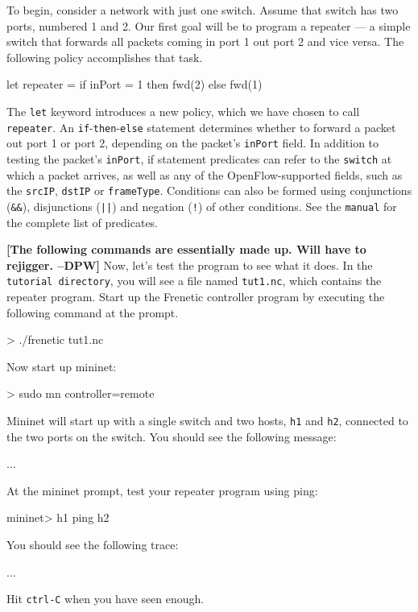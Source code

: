 \documentclass{article}
\newcommand{\finish}[2][cornellred]{\ifdraft\textcolor{#1}{\textbf{[#2]}}\fi}
\newcommand{\dpw}[1]{\finish[cornellred]{#1 --DPW}}
\newcommand{\code}[1]{\texttt{#1}}
\newcommand{\tutorialdir}{\texttt{tutorial directory}}
\newcommand{\manualref}{\texttt{manual}}
\begin{document}
To begin, consider a network with just one switch.  Assume that switch 
has two ports, numbered 1 and 2.  Our first goal will be to program
a repeater --- a simple switch that forwards all packets coming in port 1
out port 2 and vice versa.  The following policy accomplishes that task.

\begin{progeg}
let repeater =
  if inPort = 1 then fwd(2)
  else fwd(1)
\end{progeg}

The \code{let} keyword introduces a new policy, which we have chosen to call 
\code{repeater}.  An \code{if}-\code{then}-\code{else} statement determines
whether to forward a packet out port 1 or port 2, depending on the packet's
\code{inPort} field.  In addition to testing the packet's \code{inPort}, 
if statement predicates can refer to
the \code{switch} 
at which a packet arrives, as well as any of the OpenFlow-supported
fields, such as the \code{srcIP}, \code{dstIP} or \code{frameType}.  
Conditions can also be formed using 
conjunctions (\code{\&\&}), disjunctions
(\code{||}) and negation (\code{!}) of other conditions.
See the \manualref{} for the complete list of predicates. 

\dpw{The following commands are essentially made up.  Will have to rejigger.}
Now, let's test the program to see what it does.  In the \tutorialdir{},
you will see a file named \code{tut1.nc}, which contains the
repeater program.  Start up the Frenetic controller program by 
executing the following command at the prompt.

\begin{progeg}
> ./frenetic tut1.nc
\end{progeg}
%
Now start up mininet:
%
\begin{progeg}
> sudo mn controller=remote
\end{progeg}
%
Mininet will start up with a single switch and two hosts, 
\code{h1} and \code{h2}, connected to the two ports on the switch.
You should see the following message:
%
\begin{progeg}
...
\end{progeg}
%
At the mininet prompt, test your repeater program using ping:
%
\begin{progeg}
mininet> h1 ping h2
\end{progeg}
%
You should see the following trace:
%
\begin{progeg}
...
\end{progeg}
%
Hit \code{ctrl-C} when you have seen enough.
\end{document}
